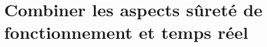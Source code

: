 \chapter{Combiner les aspects sûreté de fonctionnement et temps réel}
\label{chap:contribution_sdf-tr}
\minitoc








